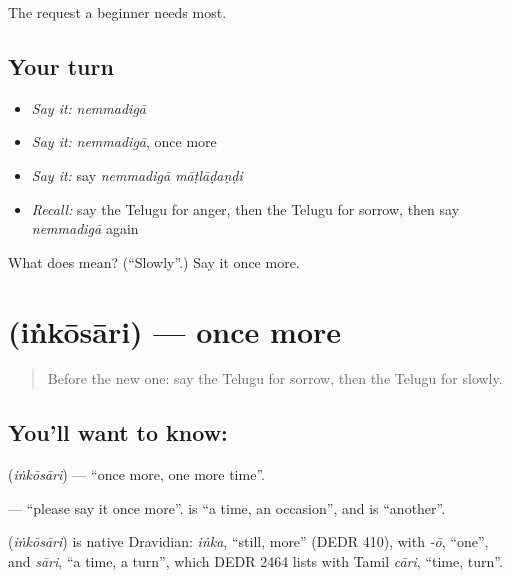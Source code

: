 \begin{grammarlens}[title={What you've built}]
The request a beginner needs most.
\end{grammarlens}

\subsection*{Your turn}
\begin{itemize}
\raggedright
  \item \emph{Say it:} \emph{nemmadigā}
  \item \emph{Say it:} \emph{nemmadigā}, once more
  \item \emph{Say it:} say \emph{nemmadigā māṭlāḍaṇḍi}
  \item \emph{Recall:} say the Telugu for anger, then the Telugu for sorrow, then say \emph{nemmadigā} again
\end{itemize}

\begin{tcolorbox}[breakable,colback=teal!4,colframe=teal!35!black,title={Before you move on}]
What does  mean? (\textquotedblleft{}Slowly\textquotedblright{}.) Say it once more.
\end{tcolorbox}
\section[\texorpdfstring{\te{ఇంకోసారి} (iṅkōsāri)}{ఇంకోసారి (iṅkōsāri)}]{ (iṅkōsāri) — once more}

\label{lesson:TE-C86-oncemore}



\begin{quote}
Before the new one: say the Telugu for sorrow, then the Telugu for slowly.
\end{quote}

\subsection*{You'll want to know: }
\textbf{} (\emph{iṅkōsāri}) — \textquotedblleft{}once more, one more time\textquotedblright{}.

\textbf{ } — \textquotedblleft{}please say it once more\textquotedblright{}. \textbf{} is \textquotedblleft{}a time, an occasion\textquotedblright{}, and \textbf{} is \textquotedblleft{}another\textquotedblright{}.

\begin{cousinweb}
\textbf{} (\emph{iṅkōsāri}) is native Dravidian: \emph{iṅka}, \textquotedblleft{}still, more\textquotedblright{} (DEDR 410), with \emph{-ō}, \textquotedblleft{}one\textquotedblright{}, and \emph{sāri}, \textquotedblleft{}a time, a turn\textquotedblright{}, which DEDR 2464 lists with Tamil \emph{cāri}, \textquotedblleft{}time, turn\textquotedblright{}.
\end{cousinweb}

